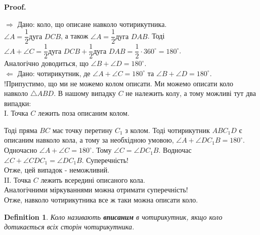 \documentclass[a4paper, 10pt]{article}
\makeatletter
\def\rightproof{$\boxed{\Rightarrow}$ }
\def\leftproof{$\boxed{\Leftarrow}$ }
\def\qed{$\blacksquare$}
\theoremstyle{theoremdd}
\theoremstyle{theoremdd}
\theoremstyle{theoremdd}
\newtheorem{definition}[theorem]{Definition}
\theoremstyle{theoremdd}
\theoremstyle{theoremdd}
\theoremstyle{theoremdd}
\theoremstyle{theoremdd}
\theoremstyle{theoremdd}
\theoremstyle{theoremdd}
\renewenvironment{proof}[1][Proof.\\]{\par
\pushQED{\hfill \qed}%
\normalfont \topsep6\p@\@plus6\p@\relax
\trivlist
\item\relax
{\bfseries
#1\@addpunct{.}}\hspace\labelsep\ignorespaces
}{%
\popQED\endtrivlist\@endpefalse
}
\makeatother
\begin{document}
\begin{proof}
\rightproof Дано: коло, що описане навколо чотирикутника.\\
$\angle A = \dfrac{1}{2} \text{дуга } DCB$, а також $\angle A = \dfrac{1}{2} \text{дуга } DAB$. Тоді\\
$\angle A + \angle C = \dfrac{1}{2} \text{дуга } DCB + \dfrac{1}{2} \text{дуга } DAB = \dfrac{1}{2} \cdot 360^\circ = 180^\circ$.\\
Аналогічно доводиться, що $\angle B + \angle D = 180^\circ$.
\bigskip \\
\leftproof Дано: чотирикутник, де $\angle A + \angle C = 180^\circ$ та $\angle B + \angle D = 180^\circ$.\\
!Припустимо, що ми не можемо колом описати. Ми можемо описати коло навколо $\triangle ABD$. В нашому випадку $C$ не належить колу, а тому можливі тут два випадки:\\
I. Точка $C$ лежить поза описаним колом.
\begin{figure}[H]
\centering
{}
\end{figure}
Тоді пряма $BC$ має точку перетину $C_1$ з колом. Тоді чотирикутник $ABC_1D$ є описаним навколо кола, а тому за необхідною умовою, $\angle A + \angle DC_1B = 180^\circ$. Одночасно $\angle A + \angle C = 180^\circ$. Тому $\angle C = \angle DC_1B$. Водночас $\angle C + \angle CDC_1 = \angle DC_1B$. Суперечність!\\
Отже, цей випадок - неможливий.\\
II. Точка $C$ лежить всередині описаного кола.\\
Аналогічними міркуваннями можна отримати суперечність!\\
Отже, навколо чотирикутника все ж таки можна описати коло.
\end{proof}

\begin{definition}
Коло називають \textbf{вписаним} в чотирикутник, якщо коло дотикається всіх сторін чотирикутника.
\end{definition}
\end{document}
